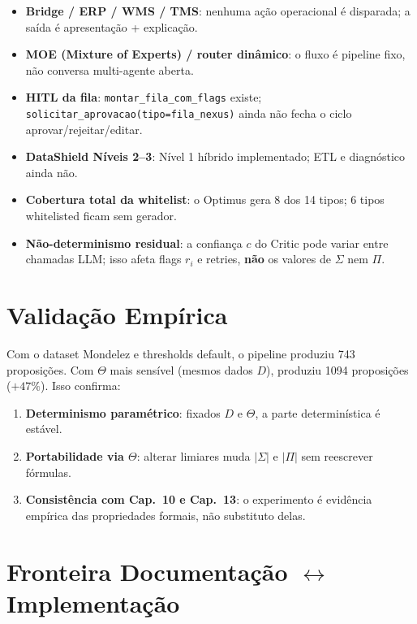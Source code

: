 \documentclass[a4paper, 12pt]{report}
\theoremstyle{definition}
\theoremstyle{remark}
\begin{document}
\begin{itemize}
  \item \textbf{Bridge / ERP / WMS / TMS}: nenhuma a\c{c}\~ao operacional
    \'e disparada; a sa\'ida \'e apresenta\c{c}\~ao + explica\c{c}\~ao.
  \item \textbf{MOE (Mixture of Experts) / router din\^amico}:
    o fluxo \'e pipeline fixo, n\~ao conversa multi-agente aberta.
  \item \textbf{HITL da fila}: \texttt{montar\_fila\_com\_flags} existe;
    \texttt{solicitar\_aprovacao(tipo=fila\_nexus)} ainda n\~ao fecha
    o ciclo aprovar/rejeitar/editar.
  \item \textbf{DataShield N\'iveis 2--3}: N\'ivel 1 h\'ibrido implementado;
    ETL e diagn\'ostico ainda n\~ao.
  \item \textbf{Cobertura total da whitelist}: o Optimus gera 8 dos
    14 tipos; 6 tipos whitelisted ficam sem gerador.
  \item \textbf{N\~ao-determinismo residual}: a confian\c{c}a $c$ do Critic
    pode variar entre chamadas LLM; isso afeta flags $r_i$ e retries,
    \textbf{n\~ao} os valores de $\Sigma$ nem $\Pi$.
\end{itemize}


\section{Valida\c{c}\~ao Emp\'irica}

Com o dataset Mondelez e thresholds default, o pipeline produziu
743 proposi\c{c}\~oes. Com $\Theta$ mais sens\'ivel (mesmos dados $D$),
produziu 1094 proposi\c{c}\~oes ($+47\%$). Isso confirma:

\begin{enumerate}
  \item \textbf{Determinismo param\'etrico}: fixados $D$ e $\Theta$,
    a parte determin\'istica \'e est\'avel.
  \item \textbf{Portabilidade via $\Theta$}: alterar limiares muda
    $|\Sigma|$ e $|\Pi|$ sem reescrever f\'ormulas.
  \item \textbf{Consist\^encia com Cap.~10 e Cap.~13}: o experimento
    \'e evid\^encia emp\'irica das propriedades formais, n\~ao substituto
    delas.
\end{enumerate}


\section{Fronteira Documenta\c{c}\~ao $\leftrightarrow$ Implementa\c{c}\~ao}
\end{document}

